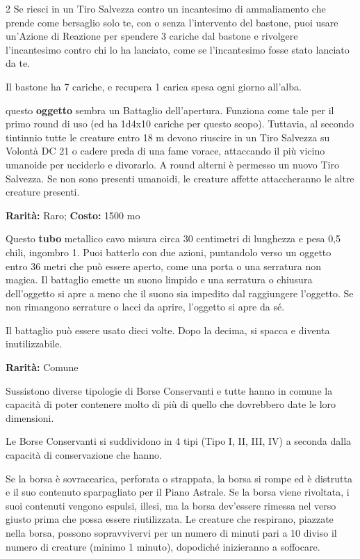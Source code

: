 \begin{multicols}{2}
Se riesci in un Tiro Salvezza contro un incantesimo di ammaliamento che prende come bersaglio solo te, con o senza l'intervento del bastone, puoi usare un'Azione di Reazione per spendere 3 cariche dal bastone e rivolgere l'incantesimo contro chi lo ha lanciato, come se l'incantesimo fosse stato lanciato da te.

Il bastone ha 7 cariche, e recupera 1 carica spesa ogni giorno all'alba.


questo \textbf{oggetto} sembra un Battaglio dell'apertura. Funziona come tale per il primo round di uso (ed ha 1d4x10 cariche per questo scopo). Tuttavia, al secondo tintinnio tutte le creature entro 18 m devono riuscire in un Tiro Salvezza su Volontà DC 21 o cadere preda di una fame vorace, attaccando il più vicino umanoide per ucciderlo e divorarlo. A round alterni è permesso un nuovo Tiro Salvezza. Se non sono presenti umanoidi, le creature affette attaccheranno le altre creature presenti.


\textbf{Rarità:} Raro; \textbf{Costo:} 1500 mo

Questo \textbf{tubo} metallico cavo misura circa 30 centimetri di lunghezza e pesa 0,5 chili, ingombro 1. Puoi batterlo con due azioni, puntandolo verso un oggetto entro 36 metri che può essere aperto, come una porta o una serratura non magica. Il battaglio emette un suono limpido e una serratura o chiusura dell'oggetto si apre a meno che il suono sia impedito dal raggiungere l'oggetto. Se non rimangono serrature o lacci da aprire, l'oggetto si apre da sé.

Il battaglio può essere usato dieci volte. Dopo la decima, si spacca e diventa inutilizzabile.


\textbf{Rarità:} Comune

Sussistono diverse tipologie di Borse Conservanti e tutte hanno in comune la capacità di poter contenere molto di più di quello che dovrebbero date le loro dimensioni.

Le Borse Conservanti si suddividono in 4 tipi (Tipo I, II, III, IV) a seconda dalla capacità di conservazione che hanno.

Se la borsa è sovraccarica, perforata o strappata, la borsa si rompe ed è distrutta e il suo contenuto sparpagliato per il Piano Astrale. Se la borsa viene rivoltata, i suoi contenuti vengono espulsi, illesi, ma la borsa dev'essere rimessa nel verso giusto prima che possa essere riutilizzata. Le creature che respirano, piazzate nella borsa, possono sopravvivervi per un numero di minuti pari a 10 diviso il numero di creature (minimo 1 minuto), dopodiché inizieranno a soffocare.


\end{multicols}
